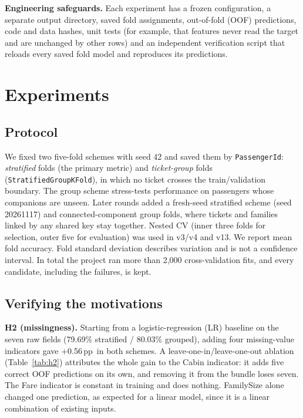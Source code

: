\documentclass[10pt,twocolumn,letterpaper]{article}
\newcommand{\pp}{\,pp}
\begin{document}
\textbf{Engineering safeguards.} Each experiment has a frozen configuration, a separate output directory, saved fold assignments, out-of-fold (OOF) predictions, code and data hashes, unit tests (for example, that features never read the target and are unchanged by other rows) and an independent verification script that reloads every saved fold model and reproduces its predictions.

\section{Experiments}\label{sec:exp}
\subsection{Protocol}
We fixed two five-fold schemes with seed 42 and saved them by \texttt{PassengerId}: \emph{stratified} folds (the primary metric) and \emph{ticket-group} folds (\texttt{StratifiedGroupKFold}), in which no ticket crosses the train/validation boundary. The group scheme stress-tests performance on passengers whose companions are unseen. Later rounds added a fresh-seed stratified scheme (seed 20261117) and connected-component group folds, where tickets and families linked by any shared key stay together. Nested CV (inner three folds for selection, outer five for evaluation) was used in v3/v4 and v13. We report mean fold accuracy. Fold standard deviation describes variation and is not a confidence interval. In total the project ran more than 2{,}000 cross-validation fits, and every candidate, including the failures, is kept.

\subsection{Verifying the motivations}
\textbf{H2 (missingness).} Starting from a logistic-regression (LR) baseline on the seven raw fields (79.69\% stratified / 80.03\% grouped), adding four missing-value indicators gave +0.56\pp\ in both schemes. A leave-one-in/leave-one-out ablation (Table~\ref{tab:h2}) attributes the whole gain to the Cabin indicator: it adds five correct OOF predictions on its own, and removing it from the bundle loses seven. The Fare indicator is constant in training and does nothing. FamilySize alone changed one prediction, as expected for a linear model, since it is a linear combination of existing inputs.
\end{document}
